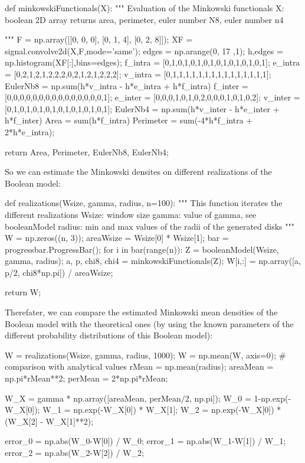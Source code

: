 \begin{python}
def minkowskiFunctionals(X):
    """
    Evaluation of the Minkowski functionals
    X: boolean 2D array
    returns area, perimeter, euler number N8, euler number n4
    
    """
    F = np.array([[0, 0, 0], [0, 1, 4], [0, 2, 8]]);
    XF = signal.convolve2d(X,F,mode='same');
    edges = np.arange(0, 17 ,1);
    h,edges = np.histogram(XF[:],bins=edges);
    f_intra = [0,1,0,1,0,1,0,1,0,1,0,1,0,1,0,1];
    e_intra = [0,2,1,2,1,2,2,2,0,2,1,2,1,2,2,2];
    v_intra = [0,1,1,1,1,1,1,1,1,1,1,1,1,1,1,1];
    EulerNb8 = np.sum(h*v_intra - h*e_intra + h*f_intra)
    f_inter = [0,0,0,0,0,0,0,0,0,0,0,0,0,0,0,1];
    e_inter = [0,0,0,1,0,1,0,2,0,0,0,1,0,1,0,2];
    v_inter = [0,1,0,1,0,1,0,1,0,1,0,1,0,1,0,1];
    EulerNb4 = np.sum(h*v_inter - h*e_inter + h*f_inter)
    Area = sum(h*f_intra)
    Perimeter = sum(-4*h*f_intra + 2*h*e_intra);
    
    return Area, Perimeter, EulerNb8, EulerNb4;

\end{python}

So we can estimate the Minkowski densites on different realizations of  the Boolean model:
\begin{python}
def realizations(Wsize, gamma, radius, n=100):
    """
    This function iterates the different realizations
    Wsize: window size
    gamma: value of gamma, see booleanModel
    radius: min and max values of the radii of the generated disks
    """
    W = np.zeros((n, 3));
    areaWsize = Wsize[0] * Wsize[1];
    bar = progressbar.ProgressBar();
    for i in bar(range(n)):
        Z = booleanModel(Wsize, gamma, radius);
        a, p, chi8, chi4 = minkowskiFunctionals(Z);
        W[i,:] = np.array([a, p/2, chi8*np.pi]) / areaWsize;
        
    return W;
\end{python}

Therefater, we can compare the estimated Minkowski mean densities of the Boolean model with the theoretical ones (by using the known parameters of the different probability distributions of this Boolean model):

\begin{python}
W = realizations(Wsize, gamma, radius, 1000);
W = np.mean(W, axis=0);
# comparison with analytical values
rMean = np.mean(radius);
areaMean = np.pi*rMean**2;
perMean = 2*np.pi*rMean;

W_X = gamma * np.array([areaMean, perMean/2, np.pi]);
W_0 = 1-np.exp(-W_X[0]);
W_1 = np.exp(-W_X[0]) * W_X[1];
W_2 = np.exp(-W_X[0]) * (W_X[2] - W_X[1]**2);

error_0 = np.abs(W_0-W[0]) / W_0;
error_1 = np.abs(W_1-W[1]) / W_1;
error_2 = np.abs(W_2-W[2]) / W_2;
\end{python}

